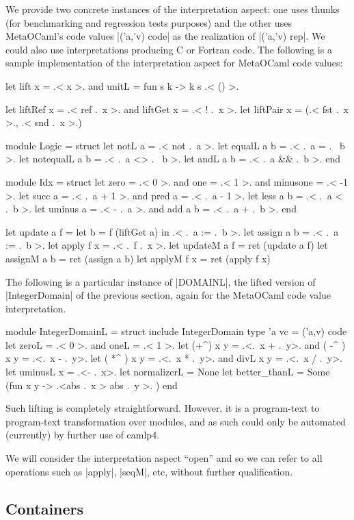 \documentclass{elsart}
\begin{document}
We provide two concrete instances of the interpretation aspect: one
uses thunks (for benchmarking and regression tests purposes) and the
other uses MetaOCaml's code values |('a,'v) code| as the realization
of |('a,'v) rep|. We could also use interpretations producing C or 
Fortran code. The following is a sample implementation of the
interpretation aspect for MetaOCaml code values:
\begin{code}
let lift x = .< x >.   and  unitL = fun s k -> k s .< () >.

let liftRef x = .< ref .~x >.  and   liftGet x = .< ! .~x >. 
let liftPair x = (.< fst .~x >., .< snd .~x >.)

module Logic = struct
  let notL a        = .< not .~a >.
  let equalL a b    = .< .~a = .~ b >.
  let notequalL a b = .< .~a <> .~ b >.
  let andL a b      = .< .~a && .~b >. 
end

module Idx = struct
  let zero = .< 0 >. and one = .< 1 >. and minusone = .< -1 >.
  let succ a = .< .~a + 1 >.  and  pred a = .< .~a - 1 >.
  let less a b = .< .~a < .~b >.
  let uminus a = .< - .~a >.  and  add a b = .< .~a + .~b >.
end

let update a f = let b = f (liftGet a) in .< .~a := .~b >.
let assign a b = .< .~a := .~b >.
let apply  f x = .< .~f .~x >.
let updateM a f = ret (update a f)
let assignM a b = ret (assign a b)
let applyM  f x = ret (apply f x)
\end{code}
The following is a particular instance of |DOMAINL|, the lifted
version of |IntegerDomain| of the previous section, again
for the MetaOCaml code value interpretation.
\begin{code}
module IntegerDomainL = struct
    include IntegerDomain
    type 'a vc = ('a,v) code
    let zeroL = .< 0 >.  and oneL = .< 1 >. 
    let (+^) x y = .<.~x + .~y>. and ( -^ ) x y = .<.~x - .~y>.
    let ( *^ ) x y = .<.~x * .~y>. and divL x y = .<.~x / .~y>. 
    let uminusL x = .<- .~x>.
    let normalizerL = None
    let better_thanL = Some (fun x y -> .<abs .~x > abs .~y >. )
end
\end{code}
Such lifting is completely straightforward.  However, it is a
program-text to program-text transformation over modules, and as such could
only be automated (currently) by further use of camlp4.

We will consider the interpretation aspect ``open'' and so we can
refer to all operations such as |apply|, |seqM|, etc, without further
qualification.


\subsection{Containers}
\end{document}
